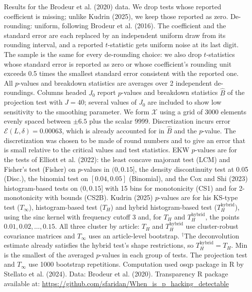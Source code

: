 \begin{table}[htbp]
\medskip
\begin{minipage}{\linewidth}
Results for the Brodeur et al. (2020) data. We drop tests whose reported coefficient is missing; unlike Kudrin (2025), we keep those reported as zero.
De-rounding: uniform, following Brodeur et al. (2016). The coefficient and the standard error are each replaced by an independent uniform draw from its rounding interval, and a reported $t$-statistic gets uniform noise at its last digit.
The sample is the same for every de-rounding choice: we also drop $t$-statistics whose standard error is reported as zero or whose coefficient's rounding unit exceeds 0.5 times the smallest standard error consistent with the reported one.
All $p$-values and breakdown statistics are averages over 2 independent de-roundings.
Columns headed $J_0$ report $p$-values and breakdown statistics $\widehat{B}$ of the projection test with $J=40$; several values of $J_0$ are included to show low sensitivity to the smoothing parameter.
We form $\mathcal{X}$ using a grid of 3000 elements evenly spaced between $\pm 6.5$ plus the scalar 9999.
Discretization incurs error $\mathcal{E}(L,\delta)=0.00063$, which is already accounted for in $\widehat{B}$ and the $p$-value.
The discretization was chosen to be made of round numbers and to give an error that is small relative to the critical values and test statistics.
EKW $p$-values are for the tests of Elliott et al. (2022): the least concave majorant test (LCM) and Fisher's test (Fisher) on $p$-values in $(0,0.15]$, the density discontinuity test at 0.05 (Disc.), the binomial test on $[0.04,0.05]$ (Binomial), and the Cox and Shi (2023) histogram-based tests on $(0,0.15]$ with 15 bins for monotonicity (CS1) and for 2-monotonicity with bounds (CS2B).
Kudrin (2025) $p$-values are for his KS-type test ($T_\infty$), histogram-based test ($T_H$) and hybrid histogram-based test ($T_H^{\mathrm{hybrid}}$), using the sinc kernel with frequency cutoff 3 and, for $T_H$ and $T_H^{\mathrm{hybrid}}$, the points $0.01,0.02,\ldots,0.15$.
All three cluster by article: $T_H$ and $T_H^{\mathrm{hybrid}}$ use cluster-robust covariance matrices and $T_\infty$ uses an article-level bootstrap.
$^\dagger$The deconvolution estimate already satisfies the hybrid test's shape restrictions, so $T_H^{\mathrm{hybrid}}=T_H$.
Min is the smallest of the averaged $p$-values in each group of tests.
The projection test and $T_\infty$ use 1000 bootstrap repetitions.
Computation used osqp package in R by Stellato et al. (2024). Data: Brodeur et al. (2020).
Transparency R package available at: \url{https://github.com/sfaridan/When_is_p_hacking_detectable}
\end{minipage}
\end{table}
